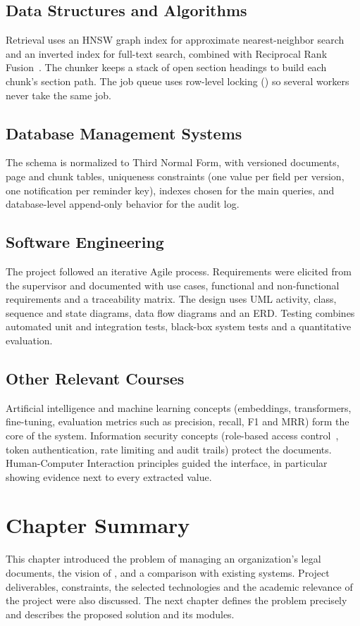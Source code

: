 \subsection{Data Structures and Algorithms}
Retrieval uses an HNSW graph index for approximate nearest-neighbor search and an inverted index for
full-text search, combined with Reciprocal Rank Fusion~\cite{cormack2009rrf}. The chunker keeps a stack
of open section headings to build each chunk's section path. The job queue uses row-level locking
() so several workers never take the same job.

\subsection{Database Management Systems}
The schema is normalized to Third Normal Form, with versioned documents, page and chunk tables,
uniqueness constraints (one value per field per version, one notification per reminder key), indexes
chosen for the main queries, and database-level append-only behavior for the audit log.

\subsection{Software Engineering}
The project followed an iterative Agile process. Requirements were elicited from the supervisor and
documented with use cases, functional and non-functional requirements and a traceability matrix. The
design uses UML activity, class, sequence and state diagrams, data flow diagrams and an ERD. Testing
combines automated unit and integration tests, black-box system tests and a quantitative evaluation.

\subsection{Other Relevant Courses}
Artificial intelligence and machine learning concepts (embeddings, transformers, fine-tuning,
evaluation metrics such as precision, recall, F1 and MRR) form the core of the system. Information
security concepts (role-based access control~\cite{sandhu1996rbac}, token authentication, rate limiting
and audit trails) protect the documents. Human-Computer Interaction principles guided the interface,
in particular showing evidence next to every extracted value.

\section{Chapter Summary}
This chapter introduced the problem of managing an organization's legal documents, the vision of
\sysname{}, and a comparison with existing systems. Project deliverables, constraints, the selected
technologies and the academic relevance of the project were also discussed. The next chapter defines
the problem precisely and describes the proposed solution and its modules.
